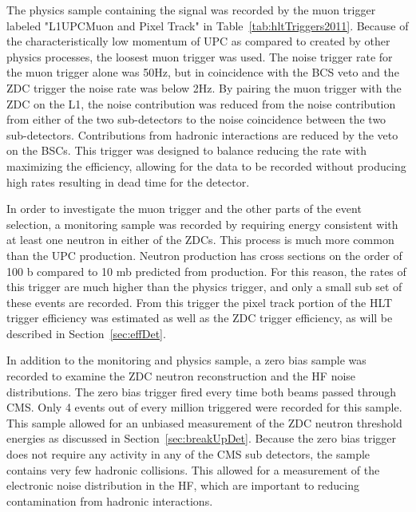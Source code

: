       The physics sample containing the \JPsi{} signal was recorded by the muon 
        trigger labeled "L1UPCMuon and Pixel Track" in 
        Table~\ref{tab:hltTriggers2011}. 
      Because of the characteristically low momentum of UPC \JPsi{} as compared
        to \JPsi{} created by other physics processes, the loosest muon 
        trigger was used.
      The noise trigger rate for the muon trigger alone was 50Hz, but in 
        coincidence with the BCS veto and the ZDC trigger the noise rate was
        below 2Hz. 
      By pairing the muon trigger with the ZDC on the L1, the noise contribution
        was reduced from the noise contribution from either of the two 
        sub-detectors to the noise coincidence between the two sub-detectors. 
      Contributions from hadronic interactions are reduced by the veto on the 
        BSCs.
      This trigger was designed to balance reducing the rate with maximizing 
        the efficiency, allowing for the data to be recorded without 
        producing high rates resulting in dead time for the detector.  
      
      In order to investigate the muon trigger and the other parts of the event 
        selection, a monitoring sample was recorded by requiring energy 
        consistent with at least one neutron in either of the ZDCs.
      This process is much more common than the UPC \JPsi{} production.
      Neutron production has cross sections on the order of 100 b compared
        to 10 mb predicted from \JPsi{} production. 
      For this reason, the rates of this trigger are much higher than the physics
        trigger, and only a small sub set of these events are recorded.
      From this trigger the pixel track portion of the HLT trigger efficiency 
        was estimated as well as the ZDC trigger efficiency, as will be described 
        in Section~\ref{sec:effDet}. 
  
      In addition to the monitoring and physics sample, a zero bias sample was 
        recorded to examine the ZDC neutron reconstruction and the HF noise 
        distributions. 
      The zero bias trigger fired every time both beams passed through CMS. 
      Only 4 events out of every million triggered were recorded for this sample. 
      This sample allowed for an unbiased measurement of the ZDC neutron 
        threshold energies as discussed in Section~\ref{sec:breakUpDet}. 
      Because the zero bias trigger does not require any activity in any of the
        CMS sub detectors, the sample contains very few hadronic collisions. 
      This allowed for a measurement of the electronic noise distribution in
        the HF, which are important to reducing contamination from hadronic
        interactions.
  
